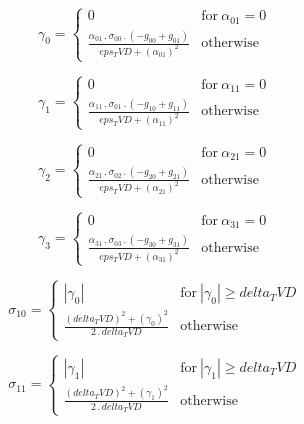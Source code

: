 \documentclass{article}
\begin{document}
\begin{dmath}\gamma_{0} = \begin{cases} 0 & \text{for}\: \alpha_{01} = 0 \\\frac{\alpha_{01} \,.\, \sigma_{0 0} \,.\, \left(- g_{00} + g_{01}\right)}{eps_TVD + \left(\alpha_{01} \right)^{2}} & \text{otherwise} \end{cases}\end{dmath}

\begin{dmath}\gamma_{1} = \begin{cases} 0 & \text{for}\: \alpha_{11} = 0 \\\frac{\alpha_{11} \,.\, \sigma_{0 1} \,.\, \left(- g_{10} + g_{11}\right)}{eps_TVD + \left(\alpha_{11} \right)^{2}} & \text{otherwise} \end{cases}\end{dmath}

\begin{dmath}\gamma_{2} = \begin{cases} 0 & \text{for}\: \alpha_{21} = 0 \\\frac{\alpha_{21} \,.\, \sigma_{0 2} \,.\, \left(- g_{20} + g_{21}\right)}{eps_TVD + \left(\alpha_{21} \right)^{2}} & \text{otherwise} \end{cases}\end{dmath}

\begin{dmath}\gamma_{3} = \begin{cases} 0 & \text{for}\: \alpha_{31} = 0 \\\frac{\alpha_{31} \,.\, \sigma_{0 3} \,.\, \left(- g_{30} + g_{31}\right)}{eps_TVD + \left(\alpha_{31} \right)^{2}} & \text{otherwise} \end{cases}\end{dmath}

\begin{dmath}\sigma_{1 0} = \begin{cases} \left|{\gamma_{0}}\right| & \text{for}\: \left|{\gamma_{0}}\right| \geq delta_TVD \\\frac{\left(delta_TVD \right)^{2} + \left(\gamma_{0} \right)^{2}}{2 \,.\, delta_TVD} & \text{otherwise} 
\end{cases}\end{dmath}

\begin{dmath}\sigma_{1 1} = \begin{cases} \left|{\gamma_{1}}\right| & \text{for}\: \left|{\gamma_{1}}\right| \geq delta_TVD \\\frac{\left(delta_TVD \right)^{2} + \left(\gamma_{1} \right)^{2}}{2 \,.\, delta_TVD} & \text{otherwise} 
\end{cases}\end{dmath}
\end{document}
